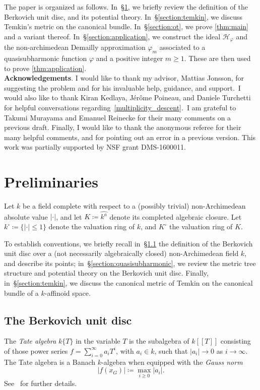 \documentclass[10pt,reqno]{amsart}
\theoremstyle{plain}
\theoremstyle{definition}
\renewcommand{\H}{\mathcal{H}}
\numberwithin{equation}{section}
\begin{document}
The paper is organized as follows. In~\S\ref{section:preliminaries}, we briefly review the definition of the Berkovich unit disc, and its potential theory. In~\S\ref{section:temkin}, we discuss Temkin's metric on the canonical bundle. In~\S\ref{section:ot}, we prove \cref{thm:main} and a variant thereof. In~\S\ref{section:application}, we construct the ideal $\H_{\varphi}$ and the non-archimedean Demailly approximation $\varphi_m$ associated to a quasisubharmonic function $\varphi$ and a positive integer $m \geq 1$. These are then used to prove \cref{thm:application}.\\

\noindent\textbf{Acknowledgements}. I would like to thank my advisor, Mattias Jonsson, for suggesting the problem and for his invaluable help, guidance, and support.\
I would also like to thank Kiran Kedlaya, J\'er\^{o}me Poineau, and Daniele Turchetti for helpful conversations regarding~\cref{multiplicity_descent}.\
I am grateful to Takumi Murayama and Emanuel Reinecke for their many comments on a previous draft. 
Finally, I would like to thank the anonymous referee for their many helpful comments, and for pointing out an error in a previous version.
This work was partially supported by NSF grant DMS-1600011.

\section{Preliminaries}\label{section:preliminaries}

Let $k$ be a field complete with respect to a (possibly trivial) non-Archimedean absolute value $| \cdot |$, and let $K \coloneqq \widehat{k^a}$ denote its completed algebraic closure. Let $k^{\circ} \coloneqq \{ | \cdot | \leq 1 \}$ denote the valuation ring of $k$, and $K^{\circ}$ the valuation ring of $K$. 

To establish conventions, we briefly recall in~\S\ref{section:disc} the definition of the Berkovich unit disc over a (not necessarily algebraically closed) non-Archimedean field $k$, and describe its points; in~\S\ref{section:quasisubharmonic}, we review the metric tree structure and potential theory on the Berkovich unit disc. Finally, in~\S\ref{section:temkin}, we discuss the canonical metric of Temkin on the canonical bundle of a $k$-affinoid space.

\subsection{The Berkovich unit disc}\label{section:disc}
The \emph{Tate algebra} $k\{ T \}$ in the variable $T$ is the subalgebra of $k[[T]]$ consisting of those power series $f = \sum_{i=0}^{\infty} a_i T^i$, with $a_i \in k$, such that $|a_i| \to 0$ as $i \to \infty$. The Tate algebra is a Banach $k$-algebra when equipped with the \emph{Gauss norm}
$$
|f(x_G)| \coloneqq \max_{i \geq 0} |a_i |.
$$
See~\cite[\S5.1]{bgr} for further details.
\end{document}
